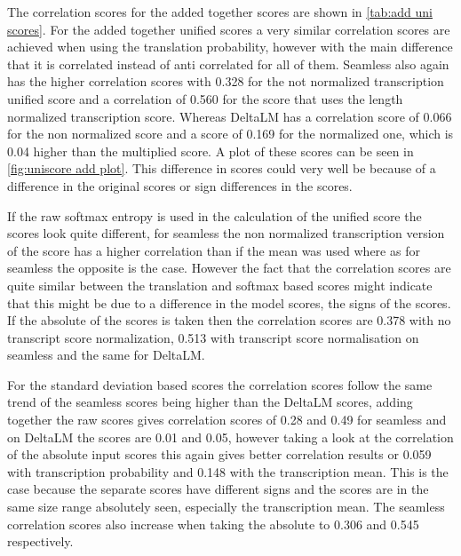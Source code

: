 The correlation scores for the added together scores are shown in \autoref{tab:add uni scores}.
For the added together unified scores a very similar correlation scores are achieved when using the translation probability, however with the main difference that it is correlated instead of anti correlated for all of them. Seamless also again has the higher correlation scores with 0.328 for the not normalized transcription unified score and a correlation of 0.560 for the score that uses the length normalized  transcription score. Whereas DeltaLM has a correlation score of 0.066 for the non normalized score and a score of 0.169 for the normalized one, which is 0.04 higher than the multiplied score. A plot of these scores can be seen in \autoref{fig:uniscore add plot}. This difference in scores could very well be because of a difference in the original scores or sign differences in the scores. 

If the raw softmax entropy is used in the calculation of the unified score the scores look quite different, for seamless the non normalized transcription version of the score has a higher correlation than if the mean was used where as for seamless the opposite is the case. However the fact that the correlation scores are quite similar between the translation and softmax based scores might indicate that this might be due to a difference in the model scores, the signs of the scores. If the absolute of the scores is taken then the correlation scores are 0.378 with no transcript score normalization, 0.513 with transcript score normalisation on seamless and the same for DeltaLM. 

For the standard deviation based scores the correlation scores follow the same trend of the seamless scores being higher than the DeltaLM scores, adding together the raw scores gives correlation scores of 0.28 and 0.49 for seamless and on DeltaLM the scores are 0.01 and 0.05, however taking a look at the correlation of the absolute input scores this again gives better correlation results or 0.059 with transcription probability and 0.148 with the transcription mean. This is the case because the separate scores have different signs and the scores are in the same size range absolutely seen, especially the transcription mean. The seamless correlation scores also increase when taking the absolute to 0.306 and 0.545 respectively. 

